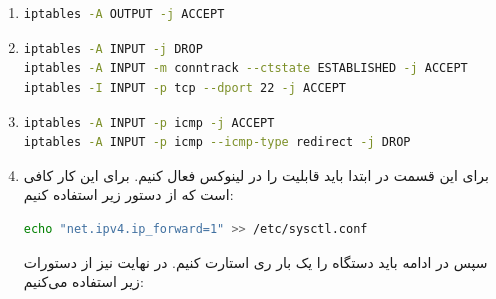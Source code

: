 \documentclass[]{article}
\begin{document}
\section{}
\section{}
\begin{enumerate}
    \item {} \begin{latin}
\begin{lstlisting}[language=sh]
iptables -A OUTPUT -j ACCEPT
\end{lstlisting}
    \end{latin}
    \item {}  \begin{latin}
\begin{lstlisting}[language=sh]
iptables -A INPUT -j DROP
iptables -A INPUT -m conntrack --ctstate ESTABLISHED -j ACCEPT
iptables -I INPUT -p tcp --dport 22 -j ACCEPT
\end{lstlisting}
\end{latin}
    \item {} \begin{latin}
\begin{lstlisting}[language=sh]
iptables -A INPUT -p icmp -j ACCEPT
iptables -A INPUT -p icmp --icmp-type redirect -j DROP
\end{lstlisting}
    \end{latin}
    \item برای این قسمت در ابتدا باید قابلیت  را در لینوکس فعال کنیم. برای این کار کافی است که از دستور زیر استفاده کنیم: \begin{latin}
\begin{lstlisting}[language=sh]
echo "net.ipv4.ip_forward=1" >> /etc/sysctl.conf
\end{lstlisting}
\end{latin}
    سپس در ادامه باید دستگاه را یک بار ری استارت کنیم. در نهایت نیز از دستورات زیر استفاده می‌کنیم: 
\begin{latin}
\begin{lstlisting}[language=sh]

\end{lstlisting}
\end{latin}
\end{enumerate}
\end{document}
